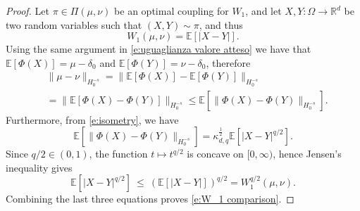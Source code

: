 \documentclass[12pt,a4paper,oneside]{amsart}
\theoremstyle{plain}
\theoremstyle{definition}
\numberwithin{equation}{section}
\numberwithin{figure}{section}
\numberwithin{table}{section}
\theoremstyle{remark}
\newcommand{\R}{\mathbb{R}}
\newcommand{\E}{\mathbb{E}}
\begin{document}
\begin{proof}
    Let $\pi\in\Pi(\mu,\nu)$ be an optimal coupling for $W_1$, and let $X,Y:\Omega\to \R^d$ be two random variables such that $(X,Y)\sim \pi$, and thus
\begin{equation*}
W_1(\mu,\nu)=\mathbb{E}[|X-Y|].    
\end{equation*}
Using the same argument in \eqref{e:uguaglianza valore atteso} we have that $\mathbb{E}[\Phi(X)]=\mu-\delta_0$ and $\mathbb{E}[\Phi(Y)]=\nu-\delta_0$, therefore
\begin{align}\label{e:eq1 wasserstein}
&\|\mu-\nu\|_{H^{-s}_0}=\big\|\E[\Phi(X)]-\E[\Phi(Y)]\big\|_{H^{-s}_0}
\\ & =\big\|\E[\Phi(X)-\Phi(Y)]\big\|_{H^{-s}_0}  \leq \E[\|\Phi(X)-\Phi(Y)\|_{H^{-s}_0}]. \nonumber
\end{align}
Furthermore, from \eqref{e:isometry}, we have 
\begin{equation*}
\E[\|\Phi(X)-\Phi(Y)\|_{H^{-s}_0}]=\kappa_{d,q}^{\frac12}\E[|X-Y|^{q/2}].    
\end{equation*}
Since $q/2\in(0,1)$, the function $t\mapsto t^{q/2}$ is concave on $[0,\infty)$, hence Jensen's inequality gives
\begin{equation}\label{e:eq 2 wasserstein}
\E[|X-Y|^{q/2}]\ \le\ (\E[|X-Y|])^{q/2}=W^{q/2}_1(\mu,\nu).    
\end{equation}
Combining the last three equations proves \eqref{e:W_1 comparison}.


\end{proof}
\end{document}
